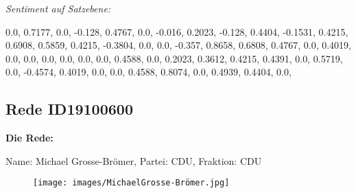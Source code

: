 \documentclass[10pt, a4paper]{report}
\begin{document}
\textit{Sentiment auf Satzebene:}

0.0, 0.7177, 0.0, -0.128, 0.4767, 0.0, -0.016, 0.2023, -0.128, 0.4404, -0.1531, 0.4215, 0.6908, 0.5859, 0.4215, -0.3804, 0.0, 0.0, -0.357, 0.8658, 0.6808, 0.4767, 0.0, 0.4019, 0.0, 0.0, 0.0, 0.0, 0.0, 0.0, 0.4588, 0.0, 0.2023, 0.3612, 0.4215, 0.4391, 0.0, 0.5719, 0.0, -0.4574, 0.4019, 0.0, 0.0, 0.4588, 0.8074, 0.0, 0.4939, 0.4404, 0.0, 
\subsection{Rede ID19100600}

\textbf{Die Rede:}

Name: Michael Grosse-Brömer, Partei: CDU, Fraktion: CDU

\begin{figure}[!ht]
\texttt{[image: images/MichaelGrosse-Brömer.jpg]}
\end{figure}
\end{document}
